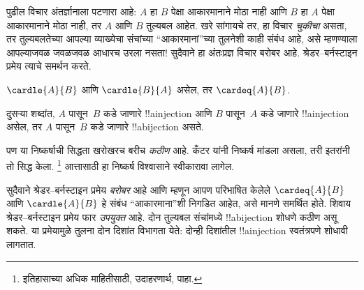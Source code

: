 \documentclass[../../../include/open-logic-section]{subfiles}
\begin{document}


\begin{explain}
पुढील विचार अंतर्ज्ञानाला पटणारा आहे: $A$ हा $B$ पेक्षा आकारमानाने मोठा नाही
आणि $B$ हा $A$ पेक्षा आकारमानाने मोठा नाही, तर $A$ आणि $B$ तुल्यबल
आहेत. खरे सांगायचे तर, हा विचार \emph{चुकीचा} असता, तर तुल्यबलतेच्या
आपल्या व्याख्येचा संचांच्या ``आकारमानां''च्या तुलनेशी काही संबंध आहे,
असे म्हणण्याला आपल्याजवळ जवळजवळ आधारच उरला नसता!{} सुदैवाने हा
अंतःप्रज्ञ विचार बरोबर आहे. श्रेडर--बर्नस्टाइन प्रमेय त्याचे समर्थन
करते.
\end{explain}

\begin{thm}[श्रेडर--बर्नस्टाइन]
	$\cardle{A}{B}$ आणि $\cardle{B}{A}$ असेल,
	तर $\cardeq{A}{B}$.
\end{thm}

\begin{explain}
दुसऱ्या शब्दांत, $A$ पासून~$B$ कडे जाणारे !!a{injection} आणि $B$
पासून~$A$ कडे जाणारे !!a{injection} असेल, तर $A$ पासून~$B$ कडे
जाणारे !!a{bijection} असते.

पण या निष्कर्षाची सिद्धता खरोखरच बरीच \emph{कठीण} आहे. कँटर यांनी
निष्कर्ष मांडला असला, तरी इतरांनी तो सिद्ध केला.
\footnote{इतिहासाच्या अधिक माहितीसाठी, उदाहरणार्थ,
\citet[पृ.~165--6]{Potter2004} पाहा.}
%
आत्तासाठी हा निष्कर्ष विश्वासाने स्वीकारावा लागेल.

सुदैवाने श्रेडर--बर्नस्टाइन प्रमेय \emph{बरोबर} आहे आणि म्हणून आपण
परिभाषित केलेले $\cardeq{A}{B}$ आणि $\cardle{A}{B}$ हे संबंध
``आकारमाना''शी निगडित आहेत, असे मानणे समर्थित होते. शिवाय
श्रेडर--बर्नस्टाइन प्रमेय फार \emph{उपयुक्त} आहे. दोन तुल्यबल संचांमध्ये
!!a{bijection} शोधणे कठीण असू शकते. या प्रमेयामुळे तुलना दोन दिशांत
विभागता येते: दोन्ही दिशांतील !!a{injection} स्वतंत्रपणे शोधावी
लागतात.
\end{explain}
\end{document}
